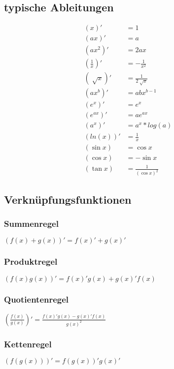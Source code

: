 \documentclass[a4paper, 8pt, landscape]{extarticle}
\begin{document}
\begin{multicols*}{5}
        \subsection{typische Ableitungen}
           	\begin{align*}
           	(x)' &= 1 \\
           	(ax)' &= a \\
           	(ax^2)' &= 2ax \\
           	(\frac{1}{x})' &= -\frac{1}{x^2} \\
           	(\sqrt[]{x})' &= \frac{1}{2\sqrt[]{x}} \\
           	(ax^b)' &= abx^{b-1} \\
           	(e^x)' &= e^x  \\
           	(e^{ax})' &= ae^{ax}  \\
           	(a^x)' &= a^x*log(a)  \\
           	(ln(x))' &= \frac{1}{x} \\
           	(\sin x) &= \cos x \\
           	(\cos x) &= -\sin x \\
           	(\tan x) &= \frac{1}{(\cos x)^2}
           	\end{align*}
        \subsection{Verknüpfungsfunktionen}
            \subsubsection{Summenregel}
            $(f(x) + g(x))' = f(x)' + g(x)'$  \\ 
            \subsubsection{Produktregel}
            $(f(x)g(x))' = f(x)'g(x)+g(x)'f(x)$  \\
            \subsubsection{Quotientenregel}
            $(\frac{f(x)}{g(x)})' = \frac{f(x)'g(x)-g(x)'f(x)}{g(x)^2}$ \\
            \subsubsection{Kettenregel}
            $(f(g(x)))' = f(g(x))'g(x)'$ \\

\end{multicols*}
\end{document}
